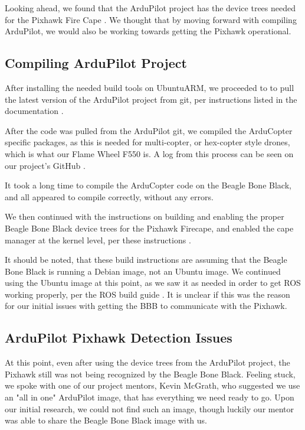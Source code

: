 \documentclass[IEEEtran,letterpaper,10pt,notitlepage,draftclsnofoot]{article}
\begin{document}
Looking ahead, we found that the ArduPilot project has the device trees needed for the Pixhawk Fire Cape
\cite{ArduGuideDeviceTrees}. We thought that by moving forward with compiling ArduPilot, we would also be working towards getting the Pixhawk operational.


\subsection{Compiling ArduPilot Project}

After installing the needed build tools on UbuntuARM, we proceeded to to pull the latest version of the
ArduPilot project from git, per instructions listed in the documentation \cite{ArduCompileBBB}.

After the code was pulled from the ArduPilot git, we compiled the ArduCopter specific packages, as this is
needed for multi-copter, or hex-copter style drones, which is what our Flame Wheel F550 is. A log from this process can be
seen on our project's GitHub \cite{ArduCompileLog}.

It took a long time to compile the ArduCopter code on the Beagle Bone Black, and all appeared to compile
correctly, without any errors.

We then continued with the instructions on building and enabling the proper Beagle Bone Black device trees
for the Pixhawk Firecape, and enabled the cape manager at the kernel level, per these instructions \cite{ArduGuideDeviceTrees}.

It should be noted, that these build instructions are assuming that the Beagle Bone Black is running a Debian
image, not an Ubuntu image. We continued using the Ubuntu image at this point, as we saw it as needed in order
to get ROS working properly, per the ROS build guide \cite{ROSBBBUbuntu}. It is unclear if
this was the reason for our initial issues with getting the BBB to communicate with the Pixhawk.

\subsection{ArduPilot Pixhawk Detection Issues}

At this point, even after using the device trees from the ArduPilot project, the Pixhawk still was not being
recognized by the Beagle Bone Black. Feeling stuck, we spoke with one of our project mentors, Kevin McGrath,
who suggested we use an "all in one" ArduPilot image, that has everything we need ready to go.
Upon our initial research, we could not find such an image, though luckily our mentor was able to share the
Beagle Bone Black image with us.
\end{document}
